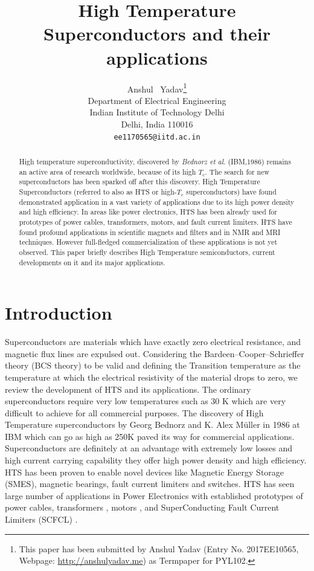 \documentclass{article}
\title{High Temperature Superconductors and their applications}
\author{
	Anshul ~Yadav\thanks{This paper has been submitted by Anshul Yadav (Entry No. 2017EE10565, Webpage: \href{http://anshulyadav.me}{http://anshulyadav.me}) as Termpaper for PYL102.} \\
	Department of Electrical Engineering\\
	Indian Institute of Technology Delhi\\
	Delhi, India 110016 \\
	\texttt{ee1170565@iitd.ac.in} \\
}
\begin{document}
	\maketitle
	
	\begin{abstract}
		High temperature superconductivity, discovered by \emph{Bednorz et al.}  (IBM,1986) remains an active area of research worldwide, because of its high $T_c$. The search for new superconductors has been sparked off after this discovery. High Temperature Superconductors (referred to also as HTS or high-$T_c$ superconductors) have found demonstrated application in a vast variety of applications due to its high power density and high efficiency.  In areas like power electronics, HTS has been already used for prototypes of power cables, transformers, motors, and fault current limiters. HTS have found profound applications in scientific magnets and filters and in NMR and MRI techniques. However full-fledged commercialization of these applications is not yet observed. This paper briefly describes High Temperature semiconductors, current developments on it and its major applications. 
	\end{abstract}
	
	
	
	
	\section{Introduction}
	Superconductors are materials which have exactly zero electrical resistance, and magnetic flux lines are expulsed out. Considering the Bardeen–Cooper–Schrieffer theory (BCS theory) to be valid and defining the Transition temperature as the temperature at which the electrical resistivity of the material drops to zero, we review the development of HTS and its applications. The ordinary superconductors require very low temperatures such as 30 K which are very difficult to achieve for all commercial purposes. The discovery of High Temperature superconductors by  Georg Bednorz and K. Alex Müller in 1986 at IBM  which can go as high as 250K \cite{highestTc} paved its way for commercial applications. Superconductors are definitely at an advantage with extremely low losses and high current carrying capability they offer high power density and high efficiency. HTS has been proven to enable novel devices like Magnetic Energy Storage (SMES), magnetic bearings, fault current limiters and switches\cite{HTSdevices}. HTS has seen large number of applications in Power Electronics with established prototypes of power cables, \cite{powercable} transformers \cite{HTStransformer}, motors \cite{HTSmotor}, and SuperConducting Fault Current Limiters (SCFCL) \cite{SCFCL}.
	
\end{document}
